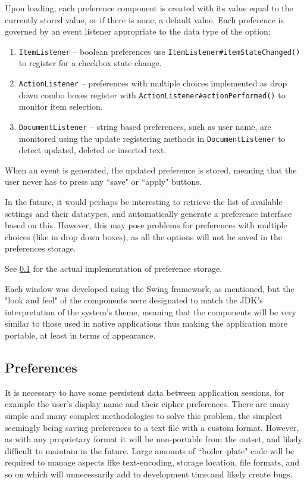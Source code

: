     Upon loading, each preference component is created with its value equal to the currently stored value, or if there is none, a default value. Each preference is governed by an event listener appropriate to the data type of the option:
    
    \begin{enumerate}
      \item \verb!ItemListener! -- boolean preferences use \verb!ItemListener#itemStateChanged()! to register for a checkbox state change.
      \item \verb!ActionListener! -- preferences with multiple choices implemented as drop down combo boxes register with \verb!ActionListener#actionPerformed()! to monitor item selection.
      \item \verb!DocumentListener! -- string based preferences, such as user name, are monitored using the update registering methods in \verb!DocumentListener! to detect updated, deleted or inserted text.
    \end{enumerate}
    
    When an event is generated, the updated preference is stored, meaning that the user never has to press any ``save" or ``apply" buttons.
    
    In the future, it would perhaps be interesting to retrieve the list of available settings and their datatypes, and automatically generate a preference interface based on this. However, this may pose problems for preferences with multiple choices (like in drop down boxes), as all the options will not be saved in the preferences storage.
    
    See \textsection\ref{subsec:prefs} for the actual implementation of preference storage.
    
    Each window was developed using the Swing framework, as mentioned, but the "look and feel" of the components were designated to match the JDK's interpretation of the system's theme, meaning that the components will be very similar to those used in native applications thus making the application more portable, at least in terms of appearance. 
    
  \subsection{Preferences}
  \label{subsec:prefs}
  
  It is necessary to have some persistent data between application sessions, for example the user's display name and their cipher preferences. There are many simple and many complex methodologies to solve this problem, the simplest seemingly being saving preferences to a text file with a custom format. However, as with any proprietary format it will be non-portable from the outset, and likely difficult to maintain in the future. Large amounts of ``boiler--plate" code will be required to manage aspects like text-encoding, storage location, file formats, and so on which will unnecessarily add to development time and likely create bugs.
  

